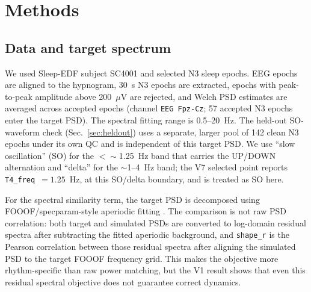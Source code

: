 \documentclass[conference]{IEEEtran}
\newcommand{\code}[1]{\texttt{#1}}
\begin{document}
\section{Methods}
\subsection{Data and target spectrum}
We used Sleep-EDF subject SC4001 and selected N3 sleep epochs. EEG epochs are
aligned to the hypnogram, 30~s N3 epochs are extracted, epochs with
peak-to-peak amplitude above 200~$\mu$V are rejected, and Welch PSD estimates
are averaged across accepted epochs (channel \code{EEG Fpz-Cz}; 57 accepted N3
epochs enter the target PSD). The spectral fitting range is 0.5--20~Hz. The
held-out SO-waveform check (Sec.~\ref{sec:heldout}) uses a separate, larger
pool of 142 clean N3 epochs under its own QC and is independent of this target
PSD. We use ``slow oscillation'' (SO) for the $<\sim$1.25~Hz band that carries
the UP/DOWN alternation and ``delta'' for the $\sim$1--4~Hz band; the V7
selected point reports \code{T4\_freq}~$=1.25$~Hz, at this SO/delta boundary,
and is treated as SO here.

For the spectral similarity term, the target PSD is decomposed using
FOOOF/specparam-style aperiodic fitting \cite{donoghue2020}. The comparison is
not raw PSD correlation: both target and simulated PSDs are converted to
log-domain residual spectra after subtracting the fitted aperiodic background,
and \code{shape\_r} is the Pearson correlation between those residual spectra
after aligning the simulated PSD to the target FOOOF frequency grid. This makes
the objective more rhythm-specific than raw power matching, but the V1 result
shows that even this residual spectral objective does not guarantee correct
dynamics.
\end{document}

